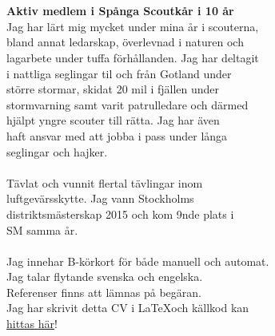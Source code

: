 \documentclass[11pt,oneside,a4paper,titlepage]{article}
\begin{document}
\begin{tcolorbox}
    \begin{minipage}[t]{2cm}
        \begin{tcolorbox}[colframe=white,colback=white]
            
        \end{tcolorbox}
    \end{minipage}
    \begin{minipage}[t]{15cm}
        \begin{tcolorbox}[colframe=white,colback=white]
            {\selectfont
                \\
                \\\textbf{Aktiv medlem i Spånga Scoutkår i 10 år}\\
                Jag har lärt mig mycket under mina år i scouterna,\\
                bland annat ledarskap, överlevnad i naturen och\\
                lagarbete under tuffa förhållanden. Jag har deltagit\\
                i nattliga seglingar til och från Gotland under\\
                större stormar, skidat 20 mil i fjällen under\\
                stormvarning samt varit patrulledare och därmed\\
                hjälpt yngre scouter till rätta. Jag har även\\
                haft ansvar med att jobba i pass under långa\\
                seglingar och hajker.\\\\
                Tävlat och vunnit flertal tävlingar inom\\
                luftgevärsskytte. Jag vann Stockholms\\
                distriktsmästerskap 2015 och kom 9nde plats i\\
                SM samma år.\\\\
                Jag innehar B-körkort för både manuell och automat.\\

                Jag talar flytande svenska och engelska.\\

                Referenser finns att lämnas på begäran.\\

                Jag har skrivit detta CV i \LaTeX och källkod kan\\
                \underline{\href{https://github.com/v-olin/resume}{hittas här}}!
            }
        \end{tcolorbox}
    \end{minipage}
\end{tcolorbox}
\end{document}
